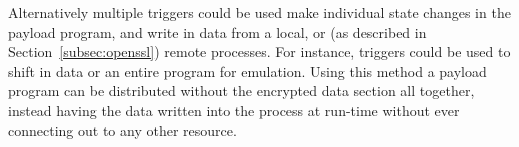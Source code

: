 \smallskip

Alternatively multiple triggers could be used make individual state changes in
the payload program, and write in data from a local, or (as described in
Section~\ref{subsec:openssl}) remote processes. For instance, triggers could be
used to shift in data or an entire program for emulation.
Using this method a payload
program can be distributed without the encrypted data section all together,
instead having the data written into the process at run-time without ever
connecting out to any other resource.





